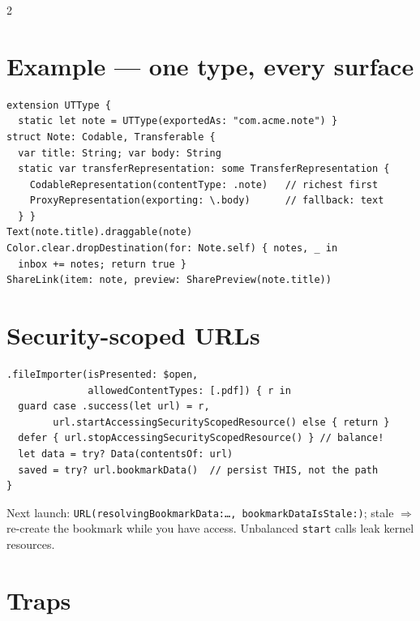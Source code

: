 \documentclass[8pt]{extarticle}
\begin{document}
\begin{multicols}{2}
\section{Example — one type, every surface}
\begin{lstlisting}[language=SwiftSheet]
extension UTType {
  static let note = UTType(exportedAs: "com.acme.note") }
struct Note: Codable, Transferable {
  var title: String; var body: String
  static var transferRepresentation: some TransferRepresentation {
    CodableRepresentation(contentType: .note)   // richest first
    ProxyRepresentation(exporting: \.body)      // fallback: text
  } }
Text(note.title).draggable(note)
Color.clear.dropDestination(for: Note.self) { notes, _ in
  inbox += notes; return true }
ShareLink(item: note, preview: SharePreview(note.title))
\end{lstlisting}

\columnbreak

\section{Security-scoped URLs}
\begin{lstlisting}[language=SwiftSheet]
.fileImporter(isPresented: $open,
              allowedContentTypes: [.pdf]) { r in
  guard case .success(let url) = r,
        url.startAccessingSecurityScopedResource() else { return }
  defer { url.stopAccessingSecurityScopedResource() } // balance!
  let data = try? Data(contentsOf: url)
  saved = try? url.bookmarkData()  // persist THIS, not the path
}
\end{lstlisting}
Next launch: \texttt{URL(resolvingBookmarkData:…, bookmarkDataIsStale:)}; stale $\Rightarrow$ re-create the
bookmark while you have access. Unbalanced \texttt{start} calls leak kernel resources.

\section{Traps}
\begin{itemize}
\end{itemize}


\end{multicols}
\end{document}
